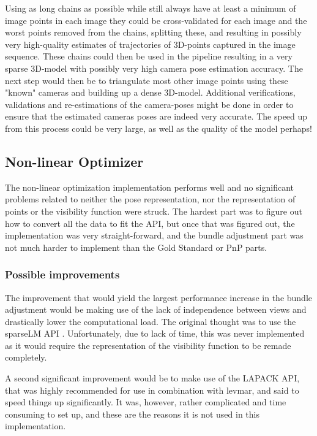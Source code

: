Using as long chains as possible while still always have at least a minimum of image points in each image they could be cross-validated for each image and the worst points removed from the chains, splitting these, and resulting in possibly very high-quality estimates of trajectories of 3D-points captured in the image sequence. These chains could then be used in the pipeline resulting in a very sparse 3D-model with possibly very high camera pose estimation accuracy. The next step would then be to triangulate most other image points using these "known" cameras and building up a dense 3D-model. Additional verifications, validations and re-estimations of the camera-poses might be done in order to ensure that the estimated cameras poses are indeed very accurate. The speed up from this process could be very large, as well as the quality of the model perhaps!

\subsection{Non-linear Optimizer}
The non-linear optimization implementation performs well and no significant problems related to neither the pose representation, nor the representation of points or the visibility function were struck. The hardest part was to figure out how to convert all the data to fit the API, but once that was figured out, the implementation was very straight-forward, and the bundle adjustment part was not much harder to implement than the Gold Standard or PnP parts.

\subsubsection{Possible improvements}
The improvement that would yield the largest performance increase in the bundle adjustment would be making use of the lack of independence between views and drastically lower the computational load. The original thought was to use the sparseLM API \cite{sparseLM}. Unfortunately, due to lack of time, this was never implemented as it would require the representation of the visibility function to be remade completely. 

A second significant improvement would be to make use of the LAPACK API, that was highly recommended for use in combination with levmar, and said to speed things up significantly. It was, however, rather complicated and time consuming to set up, and these are the reasons it is not used in this implementation.

